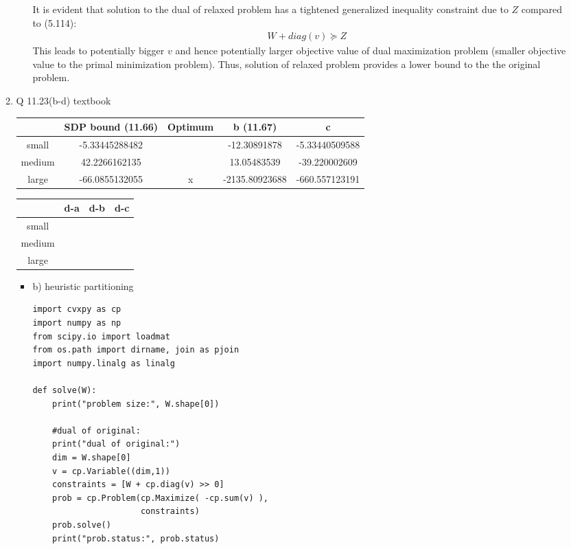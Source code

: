 \documentclass[12pt,letter]{article}
\begin{document}
\begin{enumerate}
\begin{enumerate}
\begin{enumerate}
      It is evident that solution to the dual of relaxed problem has a tightened generalized inequality constraint due to $Z$ compared to (5.114):
      \begin{align*}
        &W + diag(v) \succeq Z
      \end{align*}
      This leads to potentially bigger $v$ and hence potentially larger objective value of dual maximization problem (smaller objective value to the primal minimization problem). Thus, solution of relaxed problem provides a lower bound to the the original problem.\\
    \end{enumerate}
    
  \pagebreak
  
\item Q 11.23(b-d) textbook\\
  
  \begin{tabular}{|c|c|c|c|c|}\hline
          & SDP bound (11.66)& Optimum & b (11.67)& c \\ \hline
    small & -5.33445288482 &  & -12.30891878 & -5.33440509588\\ \hline
    medium & 42.2266162135 &  & 13.05483539 & -39.220002609\\ \hline
    large & -66.0855132055 & x & -2135.80923688 & -660.557123191\\ \hline
  \end{tabular}

    \begin{tabular}{|c|c|c|c|}\hline
      & d-a & d-b & d-c\\ \hline
      small & & &\\ \hline
      medium & & & \\ \hline
      large & & &\\ \hline
    \end{tabular}
\pagebreak
    \begin{itemize}
    \item b) heuristic partitioning
\begin{verbatim}
import cvxpy as cp
import numpy as np
from scipy.io import loadmat
from os.path import dirname, join as pjoin
import numpy.linalg as linalg

def solve(W):
    print("problem size:", W.shape[0])
    
    #dual of original:
    print("dual of original:")
    dim = W.shape[0]
    v = cp.Variable((dim,1))
    constraints = [W + cp.diag(v) >> 0]
    prob = cp.Problem(cp.Maximize( -cp.sum(v) ),
                      constraints)
    prob.solve()
    print("prob.status:", prob.status)
    

\end{verbatim}
\end{itemize}
\end{enumerate}
\end{enumerate}
\end{document}
